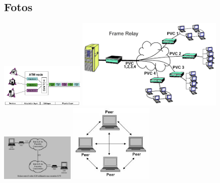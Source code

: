 \documentclass[a4paper,openright,12pt]{report}
\begin{document}
\begin{titlepage}
\begin{large}
\chapter{Fotos}\label{cap.desenlace}
\includegraphics[width=4cm]{./images/1}
\includegraphics[width=7cm]{./images/2}
\includegraphics[width=3.5cm]{./images/3}
\includegraphics[width=4cm]{./images/4}


\end{large}

\end{titlepage}
\end{document}
